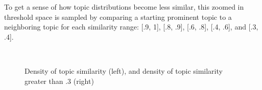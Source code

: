 \documentclass[10pt]{article}
\begin{document}
To get a sense of how topic distributions become less similar, this zoomed in threshold space is sampled by comparing a starting prominent topic to a neighboring topic for each similarity range: [.9, 1], [.8, .9], [.6, .8], [.4, .6], and [.3, .4].

   
\begin{figure}
\centering
\mbox{
}
\caption{Density of topic similarity (left), and density of topic similarity greater than .3 (right)}
\end{figure}
\end{document}
